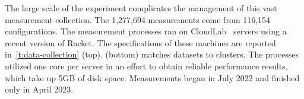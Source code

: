 
The large scale of the experiment complicates the management of this vast
measurement collection.  The 1,277,694 measurements come from 116,154
configurations.  The measurement processes ran on CloudLab~\cite{cloudlab}
servers using a recent
version of Racket.
The specifications of these machines are reported in~\cref{t:data-collection} (top).
 (bottom) matches datasets to clusters.
The processes utilized one core per server in an effort to obtain reliable performance
results, which take up 5GB of disk space.
Measurements began in July 2022 and finished only in April 2023.


